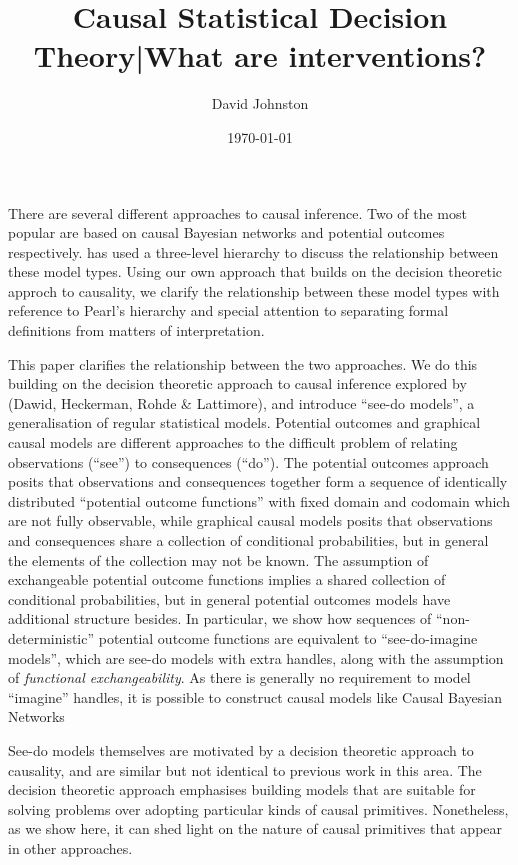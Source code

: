 \documentclass{book}
\title{Causal Statistical Decision Theory|What are interventions?}
\date{\today}
\author{ David Johnston }
\theoremstyle{plain}
\theoremstyle{definition}
\begin{document}
\maketitle


There are several different approaches to causal inference. Two of the most popular are based on causal Bayesian networks and potential outcomes respectively. \citet{Pearl} has used a three-level hierarchy to discuss the relationship between these model types. Using our own approach that builds on the decision theoretic approch to causality, we clarify the relationship between these model types with reference to Pearl's hierarchy and special attention to separating formal definitions from matters of interpretation. 

This paper clarifies the relationship between the two approaches. We do this building on the decision theoretic approach to causal inference explored by (Dawid, Heckerman, Rohde \& Lattimore), and introduce ``see-do models'', a generalisation of regular statistical models. Potential outcomes and graphical causal models are different approaches to the difficult problem of relating observations (``see'') to consequences (``do''). The potential outcomes approach posits that observations and consequences together form a sequence of identically distributed ``potential outcome functions'' with fixed domain and codomain which are not fully observable, while graphical causal models posits that observations and consequences share a collection of conditional probabilities, but in general the elements of the collection may not be known. The assumption of exchangeable potential outcome functions implies a shared collection of conditional probabilities, but in general potential outcomes models have additional structure besides. In particular, we show how sequences of ``non-deterministic'' potential outcome functions are equivalent to ``see-do-imagine models'', which are see-do models with extra handles, along with the assumption of \emph{functional exchangeability}. As there is generally no requirement to model ``imagine'' handles, it is possible to construct causal models like Causal Bayesian Networks

See-do models themselves are motivated by a decision theoretic approach to causality, and are similar but not identical to previous work in this area. The decision theoretic approach emphasises building models that are suitable for solving problems over adopting particular kinds of causal primitives. Nonetheless, as we show here, it can shed light on the nature of causal primitives that appear in other approaches.
\tableofcontents
\end{document}
